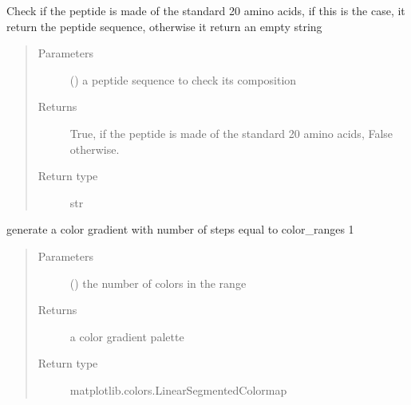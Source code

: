 \documentclass[letterpaper,10pt,english]{sphinxmanual}
\begin{document}
\begin{fulllineitems}
\label{\detokenize{IPTK.Utils:IPTK.Utils.UtilityFunction.check_peptide_made_of_std_20_aa}}
Check if the peptide is made of the standard 20 amino acids, if this is the case, 
it return the peptide sequence, otherwise it return an empty string
\begin{quote}\begin{description}
\item[{Parameters}] \leavevmode
{} () \textendash{} a peptide sequence to check its composition

\item[{Returns}] \leavevmode
True, if the peptide is made of the standard 20 amino acids, False otherwise.

\item[{Return type}] \leavevmode
str

\end{description}\end{quote}

\end{fulllineitems}


\begin{fulllineitems}
\label{\detokenize{IPTK.Utils:IPTK.Utils.UtilityFunction.generate_color_scale}}
generate a color gradient with number of steps equal to color\_ranges \sphinxhyphen{}1
\begin{quote}\begin{description}
\item[{Parameters}] \leavevmode
{} () \textendash{} the number of colors in the range

\item[{Returns}] \leavevmode
a color gradient palette

\item[{Return type}] \leavevmode
matplotlib.colors.LinearSegmentedColormap

\end{description}\end{quote}

\end{fulllineitems}
\end{document}
